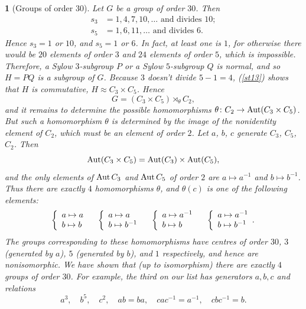 \documentclass[a4paper,11pt,final]{memoir}%
\newtheorem{plain}[X]{}
\theoremstyle{nonumberplain}
\begin{document}
\begin{plain}
[Groups of order 30]\label{st17}%
%
Let $G$ be a group of order $30$. Then
\begin{align*}
s_{3}  &  =1,4,7,10,\ldots\text{ and divides }10;\\
s_{5}  &  =1,6,11,\ldots\text{ and divides $6$}.
\end{align*}
Hence $s_{3}=1$ or $10$, and $s_{5}=1$ or $6$. In fact, at least one is $1$,
for otherwise there would be $20$ elements of order $3$ and $24$ elements of
order $5$, which is impossible. Therefore, a Sylow $3$-subgroup $P$ or a Sylow
$5$-subgroup $Q$ is normal, and so $H=PQ$ is a subgroup of $G$. Because $3$
doesn't divide $5-1=4$, (\ref{st13}) shows that $H$ is commutative, $H\approx
C_{3}\times C_{5}$. Hence
\[
G=(C_{3}\times C_{5})\rtimes_{\theta}C_{2},
\]
and it remains to determine the possible homomorphisms $\theta\colon
C_{2}\rightarrow\operatorname{Aut}(C_{3}\times C_{5})$. But such a homomorphism $\theta$ is
determined by the image of the nonidentity element of $C_{2}$, which must be
an element of order $2$. Let $a$, $b$, $c$ generate $C_{3}$, $C_{5}$, $C_{2}$.
Then
\[
\operatorname{Aut}(C_{3}\times C_{5})=\operatorname{Aut}(C_{3})\times\operatorname{Aut}(C_{5}),
\]
and the only elements of $\operatorname{Aut} C_{3}$ and $\operatorname{Aut} C_{5}$ of order $2$ are
$a\mapsto a^{-1}$ and $b\mapsto b^{-1}$. Thus there are exactly $4$
homomorphisms $\theta$, and $\theta(c)$ is one of the following elements:
\[
\left\{
\begin{array}
[c]{l}%
a\mapsto a\\
b\mapsto b
\end{array}
\quad\right.  \left\{
\begin{array}
[c]{l}%
a\mapsto a\\
b\mapsto b^{-1}%
\end{array}
\quad\right.  \left\{
\begin{array}
[c]{l}%
a\mapsto a^{-1}\\
b\mapsto b
\end{array}
\quad\right.  \left\{
\begin{array}
[c]{l}%
a\mapsto a^{-1}\\
b\mapsto b^{-1}%
\end{array}
.\right.
\]
The groups corresponding to these homomorphisms have centres of order $30$,
$3$ (generated by $a$), $5$ (generated by $b$), and $1$ respectively, and
hence are nonisomorphic. We have shown that (up to isomorphism) there are
exactly $4$ groups of order $30$. For example, the third on our list has
generators $a,b,c$ and relations
\[
a^{3},\quad b^{5},\quad c^{2},\quad ab=ba,\quad cac^{-1}=a^{-1},\quad
cbc^{-1}=b.
\]

\end{plain}
\end{document}
